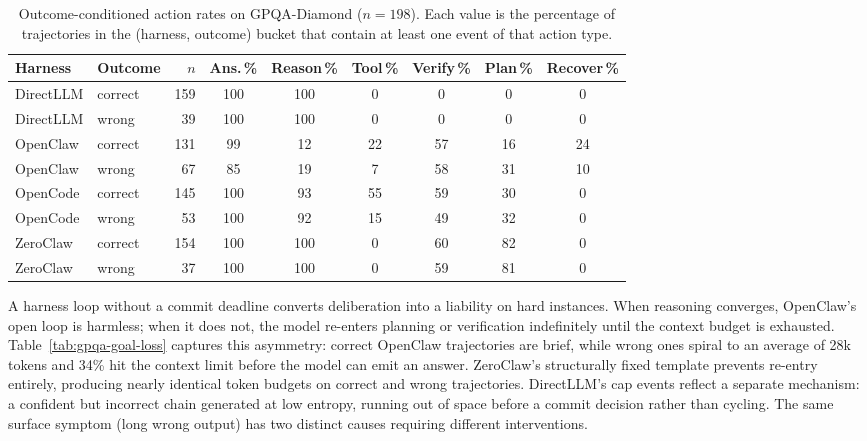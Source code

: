 \begin{table}[t]
\centering
\small
\caption{%
  Outcome-conditioned action rates on GPQA-Diamond ($n=198$).
  Each value is the percentage of trajectories in the (harness, outcome) bucket
  that contain at least one event of that action type.
}
\label{tab:gpqa-action-rates}
\setlength{\tabcolsep}{4pt}
\begin{tabular}{llrcccccc}
\toprule
Harness & Outcome & $n$ & Ans.\,\% & Reason\,\% & Tool\,\% & Verify\,\% & Plan\,\% & Recover\,\% \\
\midrule
DirectLLM & correct & 159 & 100 & 100 &  0 &  0 &  0 &  0 \\
DirectLLM & wrong   &  39 & 100 & 100 &  0 &  0 &  0 &  0 \\
\midrule
OpenClaw  & correct & 131 &  99 &  12 & 22 & 57 & 16 & 24 \\
OpenClaw  & wrong   &  67 &  85 &  19 &  7 & 58 & 31 & 10 \\
\midrule
OpenCode  & correct & 145 & 100 &  93 & 55 & 59 & 30 &  0 \\
OpenCode  & wrong   &  53 & 100 &  92 & 15 & 49 & 32 &  0 \\
\midrule
ZeroClaw  & correct & 154 & 100 & 100 &  0 & 60 & 82 &  0 \\
ZeroClaw  & wrong   &  37 & 100 & 100 &  0 & 59 & 81 &  0 \\
\bottomrule
\end{tabular}
\end{table}


A harness loop without a commit deadline converts deliberation into a liability
on hard instances.
When reasoning converges, OpenClaw's open loop is harmless; when it does not,
the model re-enters planning or verification indefinitely until the context
budget is exhausted.
Table~\ref{tab:gpqa-goal-loss} captures this asymmetry: correct OpenClaw
trajectories are brief, while wrong ones spiral to an average of 28k tokens and
34\% hit the context limit before the model can emit an answer.
ZeroClaw's structurally fixed template prevents re-entry entirely, producing
nearly identical token budgets on correct and wrong trajectories.
DirectLLM's cap events reflect a separate mechanism: a confident but incorrect
chain generated at low entropy, running out of space before a commit decision
rather than cycling.
The same surface symptom (long wrong output) has two distinct causes requiring
different interventions.

